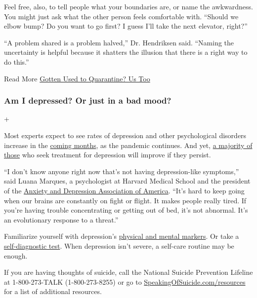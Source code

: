 Feel free, also, to tell people what your boundaries are, or name the
awkwardness. You might just ask what the other person feels comfortable
with. ``Should we elbow bump? Do you want to go first? I guess I'll take
the next elevator, right?''

``A problem shared is a problem halved,'' Dr. Hendriksen said. ``Naming
the uncertainty is helpful because it shatters the illusion that there
is a right way to do this.''

Read More
\href{https://www.nytimes3xbfgragh.onion/2020/06/27/at-home/manage-your-coronavirus-anxiety.html}{Gotten
Used to Quarantine? Us Too}

\hypertarget{am-i-depressed-or-just-in-a-bad-mood}{%
\subsubsection{Am I depressed? Or just in a bad
mood?}\label{am-i-depressed-or-just-in-a-bad-mood}}

+

Most experts expect to see rates of depression and other psychological
disorders increase in the
\href{https://www.nytimes3xbfgragh.onion/2020/04/18/health/coronavirus-america-future.html}{coming
months}, as the pandemic continues. And yet,
\href{https://www.sciencedaily.com/releases/2015/03/150311160240.htm}{a
majority of those} who seek treatment for depression will improve if
they persist.

``I don't know anyone right now that's not having depression-like
symptoms,'' said Luana Marques, a psychologist at Harvard Medical School
and the president of the \href{https://adaa.org/}{Anxiety and Depression
Association of America}. ``It's hard to keep going when our brains are
constantly on fight or flight. It makes people really tired. If you're
having trouble concentrating or getting out of bed, it's not abnormal.
It's an evolutionary response to a threat.''

Familiarize yourself with depression's
\href{https://www.mayoclinic.org/diseases-conditions/depression/expert-answers/clinical-depression/faq-20057770}{physical
and mental markers}. Or take a
\href{https://www.med.umich.edu/1info/FHP/practiceguides/depress/phq-9.pdf}{self-diagnostic
test}. When depression isn't severe, a self-care routine may be enough.

If you are having thoughts of suicide, call the National Suicide
Prevention Lifeline at 1-800-273-TALK (1-800-273-8255) or go to
\href{http://speakingofsuicide.com/resources}{SpeakingOfSuicide.com/resources}
for a list of additional resources.

